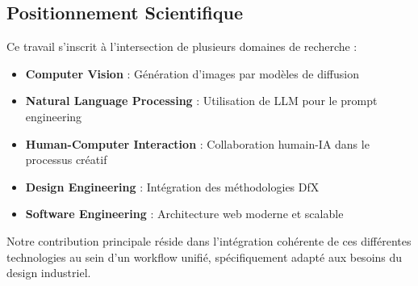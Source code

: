 \subsection{Positionnement Scientifique}

Ce travail s'inscrit à l'intersection de plusieurs domaines de recherche :

\begin{itemize}[leftmargin=*]
    \item \textbf{Computer Vision} : Génération d'images par modèles de diffusion
    \item \textbf{Natural Language Processing} : Utilisation de LLM pour le prompt engineering
    \item \textbf{Human-Computer Interaction} : Collaboration humain-IA dans le processus créatif
    \item \textbf{Design Engineering} : Intégration des méthodologies DfX
    \item \textbf{Software Engineering} : Architecture web moderne et scalable
\end{itemize}

Notre contribution principale réside dans l'intégration cohérente de ces différentes technologies au sein d'un workflow unifié, spécifiquement adapté aux besoins du design industriel.
